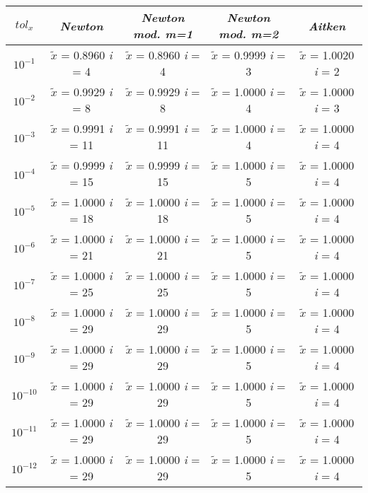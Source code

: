 \begin{center}
\begin{tabular}{|c|c|c|c|c|}
\hline
$tol_x$ & \textit{Newton} & \textit{Newton mod. m=1} & \textit{Newton mod. m=2} & \textit{Aitken} \\
\hline
$10^{-1}$ & $\tilde{x}$ = 0.8960 \textit{i} = 4 & $\tilde{x}$ = 0.8960 \textit{i} = 4 & $\tilde{x}$ = 0.9999 \textit{i} = 3 & $\tilde{x}$ = 1.0020 \textit{i} = 2\\
$10^{-2}$ & $\tilde{x}$ = 0.9929 \textit{i} = 8 & $\tilde{x}$ = 0.9929 \textit{i} = 8 & $\tilde{x}$ = 1.0000 \textit{i} = 4 & $\tilde{x}$ = 1.0000 \textit{i} = 3\\
$10^{-3}$ & $\tilde{x}$ = 0.9991 \textit{i} = 11 & $\tilde{x}$ = 0.9991 \textit{i} = 11 & $\tilde{x}$ = 1.0000 \textit{i} = 4 & $\tilde{x}$ = 1.0000 \textit{i} = 4\\
$10^{-4}$ & $\tilde{x}$ = 0.9999 \textit{i} = 15 & $\tilde{x}$ = 0.9999 \textit{i} = 15 & $\tilde{x}$ = 1.0000 \textit{i} = 5 & $\tilde{x}$ = 1.0000 \textit{i} = 4\\
$10^{-5}$ & $\tilde{x}$ = 1.0000 \textit{i} = 18 & $\tilde{x}$ = 1.0000 \textit{i} = 18 & $\tilde{x}$ = 1.0000 \textit{i} = 5 & $\tilde{x}$ = 1.0000 \textit{i} = 4\\
$10^{-6}$ & $\tilde{x}$ = 1.0000 \textit{i} = 21 & $\tilde{x}$ = 1.0000 \textit{i} = 21 & $\tilde{x}$ = 1.0000 \textit{i} = 5 & $\tilde{x}$ = 1.0000 \textit{i} = 4\\
$10^{-7}$ & $\tilde{x}$ = 1.0000 \textit{i} = 25 & $\tilde{x}$ = 1.0000 \textit{i} = 25 & $\tilde{x}$ = 1.0000 \textit{i} = 5 & $\tilde{x}$ = 1.0000 \textit{i} = 4\\
$10^{-8}$ & $\tilde{x}$ = 1.0000 \textit{i} = 29 & $\tilde{x}$ = 1.0000 \textit{i} = 29 & $\tilde{x}$ = 1.0000 \textit{i} = 5 & $\tilde{x}$ = 1.0000 \textit{i} = 4\\
$10^{-9}$ & $\tilde{x}$ = 1.0000 \textit{i} = 29 & $\tilde{x}$ = 1.0000 \textit{i} = 29 & $\tilde{x}$ = 1.0000 \textit{i} = 5 & $\tilde{x}$ = 1.0000 \textit{i} = 4\\
$10^{-10}$ & $\tilde{x}$ = 1.0000 \textit{i} = 29 & $\tilde{x}$ = 1.0000 \textit{i} = 29 & $\tilde{x}$ = 1.0000 \textit{i} = 5 & $\tilde{x}$ = 1.0000 \textit{i} = 4\\
$10^{-11}$ & $\tilde{x}$ = 1.0000 \textit{i} = 29 & $\tilde{x}$ = 1.0000 \textit{i} = 29 & $\tilde{x}$ = 1.0000 \textit{i} = 5 & $\tilde{x}$ = 1.0000 \textit{i} = 4\\
$10^{-12}$ & $\tilde{x}$ = 1.0000 \textit{i} = 29 & $\tilde{x}$ = 1.0000 \textit{i} = 29 & $\tilde{x}$ = 1.0000 \textit{i} = 5 & $\tilde{x}$ = 1.0000 \textit{i} = 4\\

\end{tabular}
\end{center}
